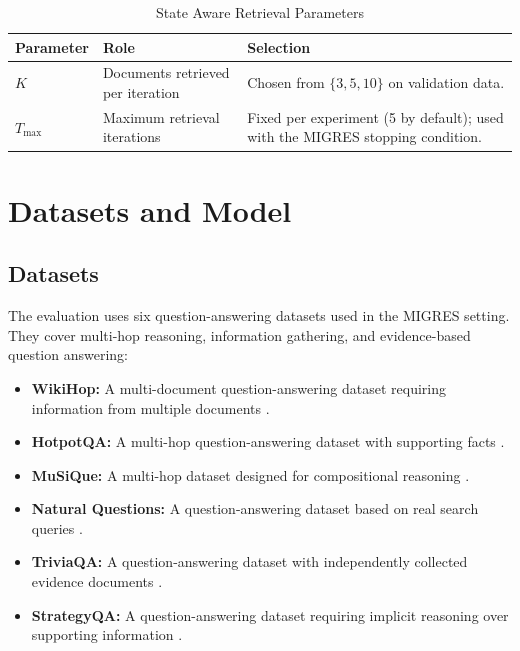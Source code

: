 \documentclass[12pt,a4paper]{report}
\begin{document}
\begin{table}[H]
\centering
\caption{State Aware Retrieval Parameters}
\label{tab:sar-parameters}
\renewcommand{\arraystretch}{1.2}
\begin{tabular}{|p{1.3in}|p{2.0in}|p{2.8in}|}
\hline
\textbf{Parameter} & \textbf{Role} & \textbf{Selection} \\ \hline
$K$ & Documents retrieved per iteration & Chosen from $\{3,5,10\}$ on validation data. \\ \hline
$T_{\max}$ & Maximum retrieval iterations & Fixed per experiment (5 by default); used with the MIGRES stopping condition. \\ \hline
\end{tabular}
\end{table}

\section{Datasets and Model}

\subsection{Datasets}

The evaluation uses six question-answering datasets used in the MIGRES setting. They cover multi-hop reasoning, information gathering, and evidence-based question answering:

\begin{itemize}
    \item \textbf{WikiHop:} A multi-document question-answering dataset requiring information from multiple documents \cite{welbl2018wikihop}.
    \item \textbf{HotpotQA:} A multi-hop question-answering dataset with supporting facts \cite{yang2018hotpotqa}.
    \item \textbf{MuSiQue:} A multi-hop dataset designed for compositional reasoning \cite{trivedi2022musique}.
    \item \textbf{Natural Questions:} A question-answering dataset based on real search queries \cite{kwiatkowski2019natural}.
    \item \textbf{TriviaQA:} A question-answering dataset with independently collected evidence documents \cite{joshi2017triviaqa}.
    \item \textbf{StrategyQA:} A question-answering dataset requiring implicit reasoning over supporting information \cite{geva2021strategyqa}.
\end{itemize}
\end{document}
